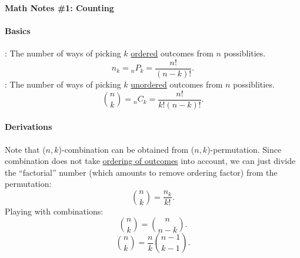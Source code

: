 \documentclass{note}
\begin{document}
\begin{center}
{\large\bf Math Notes \#1: Counting}
\end{center}

\paragraph{Basics}
\bit
\w {}: The number of ways of picking $k$ \underline{ordered}
outcomes from $n$ possiblities.
  \[ n_k = {}_nP_k = \frac{n!}{(n-k)!}. \]
\w {}: The number of ways of picking $k$ \underline{unordered}
outcomes from $n$ possiblities. 
  \[ {n \choose k} = {}_nC_k = \frac{n!}{k!(n-k)!}.\]
\eit

\paragraph{Derivations}
\bit
\w Note that ($n, k$)-combination can be obtained from ($n,
k$)-permutation. Since combination does not take \underline{ordering of
  outcomes\/} into account, we can just divide the ``factorial'' number (which
amounts to remove ordering factor) from the permutation:
\[{n \choose k} = \frac{n_k}{k!}.\]
\w Playing with combinations:
\[ {n \choose k} = {n \choose n - k}.\]
\[ {n \choose k} = \frac{n}{k}{n-1 \choose k-1}.\]
\eit
\end{document}
